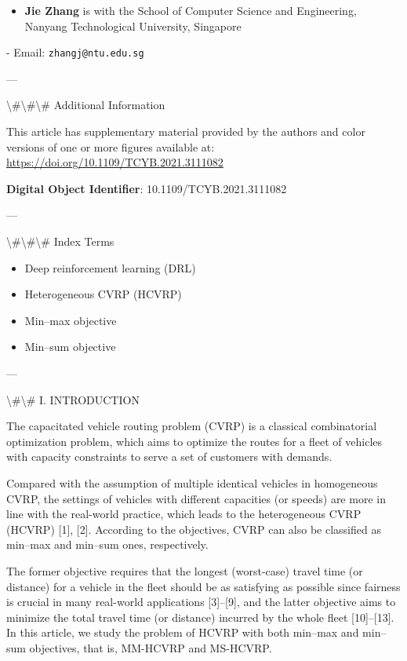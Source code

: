 \documentclass{article}
\begin{document}
	\begin{itemize}
		\item \textbf{Jie Zhang} is with the School of Computer Science and Engineering, Nanyang Technological University, Singapore  
	\end{itemize}
	- Email: \texttt{zhangj@ntu.edu.sg}
	
	---
	
	\textbackslash{}#\textbackslash{}#\textbackslash{}# Additional Information
	
	This article has supplementary material provided by the authors and color versions of one or more figures available at:
	\href{https://doi.org/10.1109/TCYB.2021.3111082}{https://doi.org/10.1109/TCYB.2021.3111082}
	
	\textbf{Digital Object Identifier}: 10.1109/TCYB.2021.3111082
	
	---
	
	\textbackslash{}#\textbackslash{}#\textbackslash{}# Index Terms
	\begin{itemize}
		\item Deep reinforcement learning (DRL)
		\item Heterogeneous CVRP (HCVRP)
		\item Min–max objective
		\item Min–sum objective
	\end{itemize}
	
	---
	
	\textbackslash{}#\textbackslash{}# I. INTRODUCTION
	
	The capacitated vehicle routing problem (CVRP) is a classical combinatorial optimization problem, which aims to optimize the routes for a fleet of vehicles with capacity constraints to serve a set of customers with demands.
	
	Compared with the assumption of multiple identical vehicles in homogeneous CVRP, the settings of vehicles with different capacities (or speeds) are more in line with the real-world practice, which leads to the heterogeneous CVRP (HCVRP) [1], [2]. According to the objectives, CVRP can also be classified as min–max and min–sum ones, respectively.
	
	The former objective requires that the longest (worst-case) travel time (or distance) for a vehicle in the fleet should be as satisfying as possible since fairness is crucial in many real-world applications [3]–[9], and the latter objective aims to minimize the total travel time (or distance) incurred by the whole fleet [10]–[13]. In this article, we study the problem of HCVRP with both min–max and min–sum objectives, that is, MM-HCVRP and MS-HCVRP.
	
\end{document}
